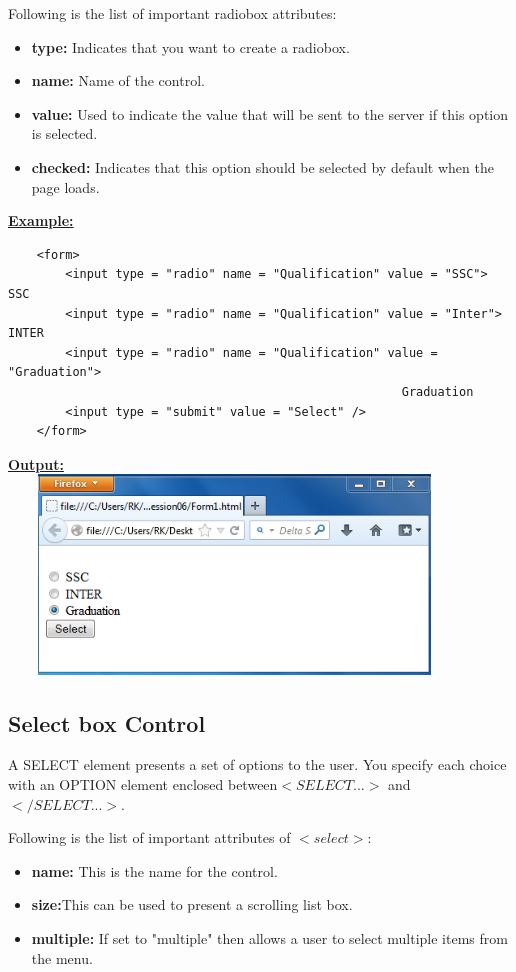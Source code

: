 \documentclass[11pt,a4paper]{article}
\begin{document}
Following is the list of important radiobox attributes:
\begin{itemize}
\item \textbf{type:} Indicates that you want to create a radiobox.
\item \textbf{name:} Name of the control.
\item \textbf{value:} Used to indicate the value that will be sent to the server if this option is selected.
\item \textbf{checked:} Indicates that this option should be selected by default when the page loads.
\end{itemize}
\underline{\textbf{Example:}}
\begin{verbatim}
    <form>
        <input type = "radio" name = "Qualification" value = "SSC"> SSC
        <input type = "radio" name = "Qualification" value = "Inter"> INTER
        <input type = "radio" name = "Qualification" value = "Graduation"> 
                                                       Graduation
        <input type = "submit" value = "Select" />
    </form>
\end{verbatim}
\underline{\textbf{Output:}}\\
\includegraphics[height = 53mm, width = 120mm]{Form8.png}
\subsection*{Select box Control}
A SELECT element presents a set of options to the user. You specify each choice with an OPTION element enclosed between$<SELECT ...>$ and $</SELECT ...>$.

Following is the list of important attributes of $<select>$:
\begin{itemize}
\item \textbf{name:} This is the name for the control.
\item \textbf{size:}This can be used to present a scrolling list box.
\item \textbf{multiple:} If set to "multiple" then allows a user to select multiple items from the menu.
\end{itemize}
\end{document}
